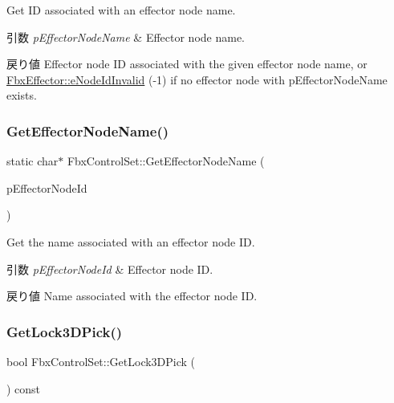 Get ID associated with an effector node name. 
\begin{DoxyParams}{引数}
{\em p\+Effector\+Node\+Name} & Effector node name. \\
\hline
\end{DoxyParams}
\begin{DoxyReturn}{戻り値}
Effector node ID associated with the given effector node name, or \hyperlink{class_fbx_effector_a26afd81fd3d41431311004c16536e739afd54cc03367f3c7365e394b009b75cf4}{Fbx\+Effector\+::e\+Node\+Id\+Invalid} (-\/1) if no effector node with p\+Effector\+Node\+Name exists. 
\end{DoxyReturn}
\mbox{\label{class_fbx_control_set_a3fab1f5e8e2c9fc176c8035009d3824f}} 
\subsubsection{\texorpdfstring{Get\+Effector\+Node\+Name()}{GetEffectorNodeName()}}
{\footnotesize\ttfamily static char$\ast$ Fbx\+Control\+Set\+::\+Get\+Effector\+Node\+Name (\begin{DoxyParamCaption}\item[{\hyperlink{class_fbx_effector_a26afd81fd3d41431311004c16536e739}{Fbx\+Effector\+::\+E\+Node\+Id}}]{p\+Effector\+Node\+Id }\end{DoxyParamCaption})\hspace{0.3cm}{\ttfamily [static]}}

Get the name associated with an effector node ID. 
\begin{DoxyParams}{引数}
{\em p\+Effector\+Node\+Id} & Effector node ID. \\
\hline
\end{DoxyParams}
\begin{DoxyReturn}{戻り値}
Name associated with the effector node ID. 
\end{DoxyReturn}
\mbox{\label{class_fbx_control_set_a27d80c87c41e04e1b54475fb3106c738}} 
\subsubsection{\texorpdfstring{Get\+Lock3\+D\+Pick()}{GetLock3DPick()}}
{\footnotesize\ttfamily bool Fbx\+Control\+Set\+::\+Get\+Lock3\+D\+Pick (\begin{DoxyParamCaption}{ }\end{DoxyParamCaption}) const}

